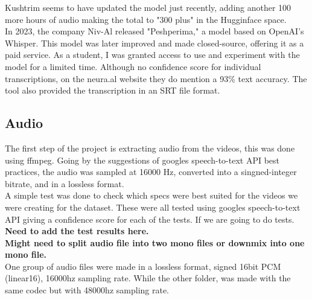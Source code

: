 \documentclass[12pt]{article}
\begin{document}
Kushtrim seems to have updated the model just recently, adding another 100 more hours of audio making the total to "300 plus" in the Hugginface space.\\
In 2023, the company Niv-Al released "Peshperima," a model based on OpenAI's Whisper. This model was later improved and made closed-source, offering it as a paid service. As a student, I was granted access to use and experiment with the model for a limited time. Although no confidence score for individual transcriptions, on the neura.al website they do mention a 93\% text accuracy. The tool also provided the transcription in an SRT file format.

\subsection{Audio}
The first step of the project is extracting audio from the videos, this was done using ffmpeg. Going by the suggestions of googles speech-to-text API best practices, the audio was sampled at 16000 Hz, converted into a singned-integer bitrate, and in a lossless format.\\
A simple test was done to check which specs were best suited for the videos we were creating for the dataset. These were all tested using googles speech-to-text API giving a confidence score for each of the tests. If we are going to do tests.\\  \textbf{Need to add the test results here. \\ Might need to split audio file into two mono files or downmix into one mono file.}
\\
One group of audio files were made in a lossless format, signed 16bit PCM (linear16), 16000hz sampling rate. While the other folder, was made with the same codec but with 48000hz sampling rate.  
\\
\end{document}
